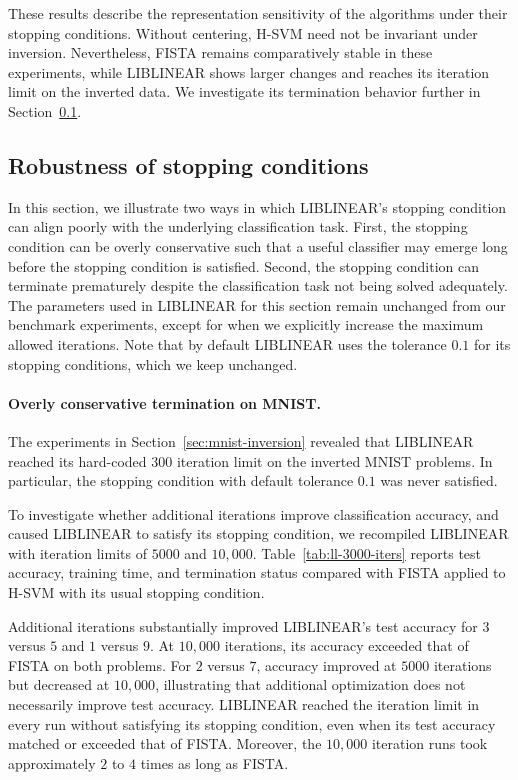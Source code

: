 \documentclass[twoside,11pt]{article}
\begin{document}
These results describe the representation sensitivity of the algorithms under their stopping conditions. Without centering, H-SVM need not be invariant under inversion. Nevertheless, FISTA remains comparatively stable in these experiments, while LIBLINEAR shows larger changes and reaches its iteration limit on the inverted data. We investigate its termination behavior further in Section~\ref{sec:ll-termination}.

\subsection{Robustness of stopping conditions} \label{sec:ll-termination}
In this section, we illustrate two ways in which LIBLINEAR's stopping condition can align poorly with the underlying classification task. First, the stopping condition can be overly conservative such that a useful classifier may emerge long before the stopping condition is satisfied. Second, the stopping condition can terminate prematurely despite the classification task not being solved adequately. The parameters used in LIBLINEAR for this section remain unchanged from our benchmark experiments, except for when we explicitly increase the maximum allowed iterations. Note that by default LIBLINEAR uses the tolerance $0.1$ for its stopping conditions, which we keep unchanged.

\paragraph{Overly conservative termination on MNIST.}
The experiments in Section~\ref{sec:mnist-inversion} revealed that LIBLINEAR reached its hard-coded $300$ iteration limit on the inverted MNIST problems. In particular, the stopping condition with default tolerance $0.1$ was never satisfied.

To investigate whether additional iterations improve classification accuracy, and caused LIBLINEAR to satisfy its stopping condition, we recompiled LIBLINEAR with iteration limits of $5000$ and $10,000$. Table~\ref{tab:ll-3000-iters} reports test accuracy, training time, and termination status compared with FISTA applied to H-SVM with its usual stopping condition.

Additional iterations substantially improved LIBLINEAR's test accuracy for $3$ versus $5$ and $1$ versus $9$. At $10,000$ iterations, its accuracy exceeded that of FISTA on both problems. For $2$ versus $7$, accuracy improved at $5000$ iterations but decreased at $10,000$, illustrating that additional optimization does not necessarily improve test accuracy. LIBLINEAR reached the iteration limit in every run without satisfying its stopping condition, even when its test accuracy matched or exceeded that of FISTA. Moreover, the $10,000$ iteration runs took approximately $2$ to $4$ times as long as FISTA.
\end{document}
